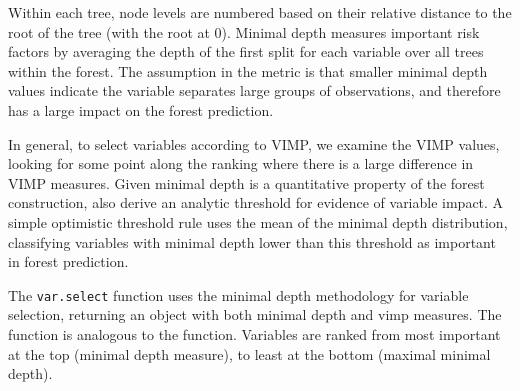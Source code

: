 \documentclass[article]{jss}
\begin{document}
Within each tree, node levels are numbered based on their relative
distance to the root of the tree (with the root at 0). Minimal depth
measures important risk factors by averaging the depth of the first
split for each variable over all trees within the forest. The assumption
in the metric is that smaller minimal depth values indicate the variable
separates large groups of observations, and therefore has a large impact
on the forest prediction.

In general, to select variables according to VIMP, we examine the VIMP
values, looking for some point along the ranking where there is a large
difference in VIMP measures. Given minimal depth is a quantitative
property of the forest construction, \cite{Ishwaran:2010} also derive an
analytic threshold for evidence of variable impact. A simple optimistic
threshold rule uses the mean of the minimal depth distribution,
classifying variables with minimal depth lower than this threshold as
important in forest prediction.

The  \texttt{var.select} function uses the minimal
depth methodology for variable selection, returning an object with both
minimal depth and vimp measures. The 
 function is analogous to the 
function. Variables are ranked from most important at the top (minimal
depth measure), to least at the bottom (maximal minimal depth).
\end{document}
